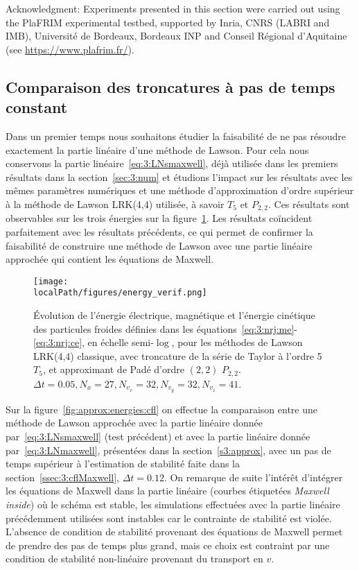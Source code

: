 \begin{otherlanguage}{english}
Acknowledgment: Experiments presented in this section were carried out using the PlaFRIM experimental testbed, supported by Inria, CNRS (LABRI and IMB), Université de Bordeaux, Bordeaux INP and Conseil Régional d’Aquitaine (see \url{https://www.plafrim.fr/}).
\end{otherlanguage}

\subsection{Comparaison des troncatures à pas de temps constant}

Dans un premier temps nous souhaitons étudier la faisabilité de ne pas résoudre exactement la partie linéaire d'une méthode de Lawson. Pour cela nous conservons la partie linéaire~\eqref{eq:3:LNsmaxwell}, déjà utilisée dans les premiers résultats dans la section~\ref{sec:3:num} et étudions l'impact sur les résultats avec les mêmes paramètres numériques et une méthode d'approximation d'ordre supérieur à la méthode de Lawson LRK(4,4) utilisée, à savoir $T_5$ et $P_{2,2}$. Ces résultats sont observables sur les trois énergies sur la figure~\ref{fig:approx:energies4d}. Les résultats coïncident parfaitement avec les résultats précédents, ce qui permet de confirmer la faisabilité de construire une méthode de Lawson avec une partie linéaire approchée qui contient les équations de Maxwell.

\begin{figure}[h]
  \centering
  \texttt{[image: \\localPath/figures/energy\_verif.png]}
  \caption{Évolution de l'énergie électrique, magnétique et l'énergie cinétique des particules froides définies dans les équations~\ref{eq:3:nrj:me}-\ref{eq:3:nrj:ce}, en échelle semi-$\log$, pour les méthodes de Lawson LRK(4,4) classique, avec troncature de la série de Taylor à l'ordre 5 $T_5$, et approximant de Padé d'ordre $(2,2)$ $P_{2,2}$. $\Delta t = 0.05, N_x=27, N_{v_x}=32, N_{v_y}=32, N_{v_z}=41$.}
  \label{fig:approx:energies4d}
\end{figure}

Sur la figure~\ref{fig:approx:energies:cfl} on effectue la comparaison entre une méthode de Lawson approchée avec la partie linéaire donnée par~\eqref{eq:3:LNsmaxwell} (test précédent) et avec la partie linéaire donnée par~\eqref{eq:3:LNmaxwell}, présentées dans la section~\ref{s3:approx}, avec un pas de temps supérieur à l'estimation de stabilité faite dans la section~\ref{ssec:3:cflMaxwell}, $\Delta t=0.12$. On remarque de suite l'intérêt d'intégrer les équations de Maxwell dans la partie linéaire (courbes étiquetées \emph{Maxwell inside}) où le schéma est stable, les simulations effectuées avec la partie linéaire précédemment utilisées sont instables car le contrainte de stabilité est violée. L'absence de condition de stabilité provenant des équations de Maxwell permet de prendre des pas de temps plus grand, mais ce choix est contraint par une condition de stabilité non-linéaire provenant du transport en $v$.

